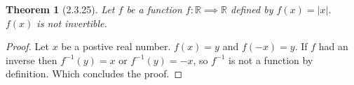 \documentclass[a4paper, 12pt]{article}
\theoremstyle{plain}
\newtheorem*{theorem*}{Theorem}
\begin{document}
	
	\begin{theorem*}[2.3.25]
		Let $f$ be a function $f: \mathbb{R} \implies \mathbb{R}$ defined by $f(x) = |x|$. $f(x)$ 
		is not invertible.
	\end{theorem*}
	
	\begin{proof}
		Let $x$ be a postive real number. $f(x) = y$ and $f(-x) = y$. If $f$ had an inverse then 
		$f^{-1}(y) = x$ or $f^{-1}(y) = -x$, so $f^{-1}$ is not a function by definition. Which
		concludes the proof.
	\end{proof}
\end{document}
